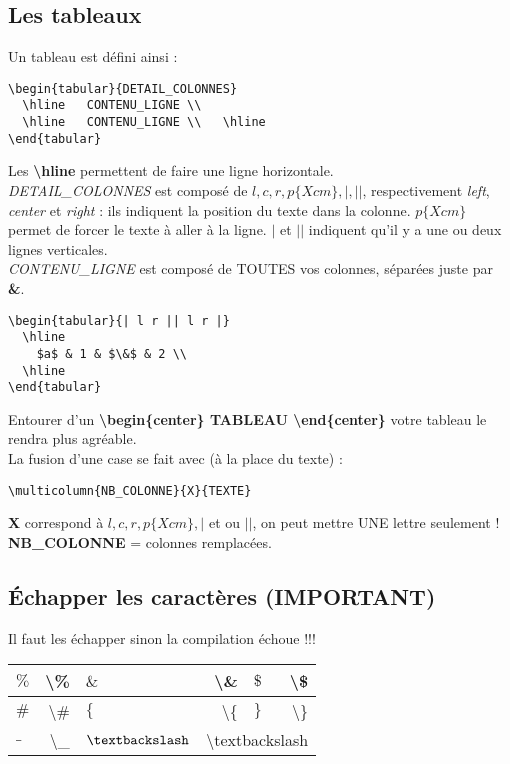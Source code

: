         \subsection{Les tableaux}
            Un tableau est défini ainsi :
            \begin{lstlisting}
\begin{tabular}{DETAIL_COLONNES}
  \hline   CONTENU_LIGNE \\
  \hline   CONTENU_LIGNE \\   \hline
\end{tabular}
            \end{lstlisting}
            Les \textbf{\textbackslash hline} permettent de faire une ligne horizontale.\\
            \textit{DETAIL\_COLONNES} est composé de $l, c, r, p\{Xcm\}, |, ||$, respectivement \textit{left}, \textit{center} et \textit{right} : ils indiquent la position du texte dans la colonne. $p\{Xcm\}$ permet de forcer le texte à aller à la ligne. $|$ et $||$ indiquent qu'il y a une ou deux lignes verticales.\\
            \textit{CONTENU\_LIGNE} est composé de TOUTES vos colonnes, séparées juste par \textbf{\&}.
            \begin{lstlisting}
\begin{tabular}{| l r || l r |}
  \hline
    $a$ & 1 & $\&$ & 2 \\
  \hline
\end{tabular}
            \end{lstlisting}
            Entourer d'un \textbf{\textbackslash begin\{center\} TABLEAU \textbackslash end\{center\}} votre tableau le rendra plus agréable.\\
            La fusion d'une case se fait avec (à la place du texte) :
            \begin{lstlisting}
\multicolumn{NB_COLONNE}{X}{TEXTE}
            \end{lstlisting}
            \textbf{X} correspond à $l, c, r, p\{Xcm\}, |$ et ou $||$, on peut mettre UNE lettre seulement ! \textbf{NB\_COLONNE} = colonnes remplacées.
        \subsection{Échapper les caractères (IMPORTANT)}
            Il faut les échapper sinon la compilation échoue !!!
            \begin{center}
                \begin{tabular}{| l r || l r || l r |}
                    \hline
                    $\%$ & \textbackslash \% & $\&$ & \textbackslash \& & $\$$ & \textbackslash \$\\
                    \hline
                    $\#$ & \textbackslash \# & $\{$ & \textbackslash \{ & $\}$ & \textbackslash \}\\
                    \hline
                    $\_$ & \textbackslash \_ & $\textbackslash$ & \multicolumn{3}{r|}{\textbackslash textbackslash} \\
                    \hline
                \end{tabular}
            \end{center}
